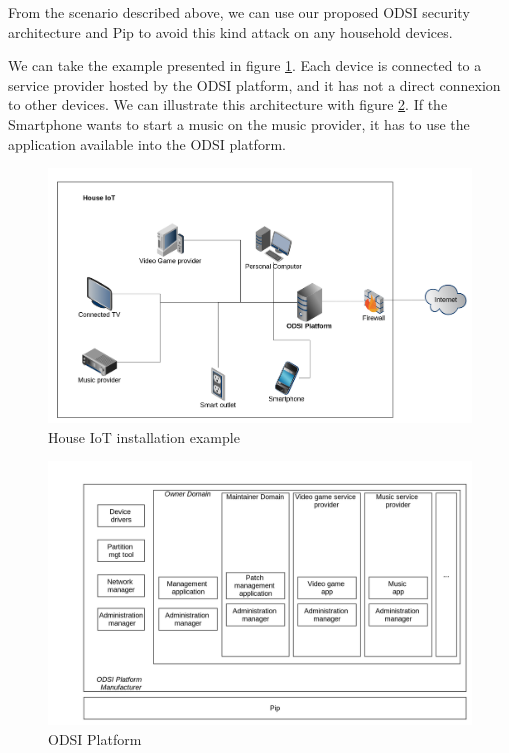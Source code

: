 \documentclass[conference]{IEEEtran}
\begin{document}
From the scenario described above\cite{Sivaraman2016}, we can use our proposed ODSI security architecture and Pip to avoid this kind attack on any household devices.

We can take the example presented in figure \ref{fig:houseiot}. Each device is connected to a service provider hosted by the ODSI platform, and it has not a direct connexion to other devices. We can illustrate this architecture with figure \ref{fig:odsiplatform}. If the Smartphone wants to start a music on the music provider, it has to use the application available into the ODSI platform.

\begin{figure}[!t]
	\centering
	\includegraphics[width=1\linewidth]{figures/HouseIOT}
	\caption[House IoT installation example]{House IoT installation example}
	\label{fig:houseiot}
\end{figure}
\begin{figure}[t!]
	\centering
	\includegraphics[width=1\linewidth]{figures/ODSIplatform}
	\caption{ODSI Platform}
	\label{fig:odsiplatform}
\end{figure}
\end{document}
